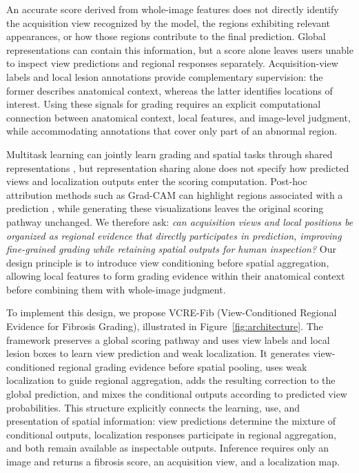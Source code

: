 An accurate score derived from whole-image features does not directly identify the acquisition view recognized by the model, the regions exhibiting relevant appearances, or how those regions contribute to the final prediction. Global representations can contain this information, but a score alone leaves users unable to inspect view predictions and regional responses separately. Acquisition-view labels and local lesion annotations provide complementary supervision: the former describes anatomical context, whereas the latter identifies locations of interest. Using these signals for grading requires an explicit computational connection between anatomical context, local features, and image-level judgment, while accommodating annotations that cover only part of an abnormal region.

Multitask learning can jointly learn grading and spatial tasks through shared representations \citep{caruana1997multitask}, but representation sharing alone does not specify how predicted views and localization outputs enter the scoring computation. Post-hoc attribution methods such as Grad-CAM can highlight regions associated with a prediction \citep{selvaraju2017gradcam}, while generating these visualizations leaves the original scoring pathway unchanged. We therefore ask: \emph{can acquisition views and local positions be organized as regional evidence that directly participates in prediction, improving fine-grained grading while retaining spatial outputs for human inspection?} Our design principle is to introduce view conditioning before spatial aggregation, allowing local features to form grading evidence within their anatomical context before combining them with whole-image judgment.

To implement this design, we propose VCRE-Fib (View-Conditioned Regional Evidence for Fibrosis Grading), illustrated in Figure~\ref{fig:architecture}. The framework preserves a global scoring pathway and uses view labels and local lesion boxes to learn view prediction and weak localization. It generates view-conditioned regional grading evidence before spatial pooling, uses weak localization to guide regional aggregation, adds the resulting correction to the global prediction, and mixes the conditional outputs according to predicted view probabilities. This structure explicitly connects the learning, use, and presentation of spatial information: view predictions determine the mixture of conditional outputs, localization responses participate in regional aggregation, and both remain available as inspectable outputs. Inference requires only an image and returns a fibrosis score, an acquisition view, and a localization map.

